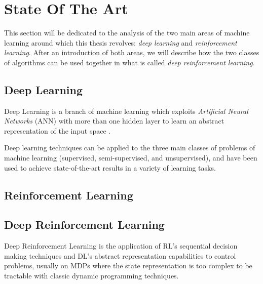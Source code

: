 \chapter{State Of The Art}
\label{ch2_SOA}
\thispagestyle{empty}

\vspace{0.5cm}

\noindent This section will be dedicated to the analysis of the two main areas 
of machine learning around which this thesis revolves: \textit{deep learning} 
and \textit{reinforcement learning}. 
After an introduction of both areas, we 
will describe how the two classes of algorithms can be used together in what is 
called \textit{deep reinforcement learning}.

\section{Deep Learning}
Deep Learning is a branch of machine learning which exploits \textit{Artificial 
Neural Networks} (ANN) with more than one hidden layer to learn an abstract 
representation of the input space \cite{lecun2015deep}. 

Deep learning techniques can be applied to the three main classes of problems 
of machine learning (supervised, semi-supervised, and unsupervised), and have 
been used to achieve state-of-the-art results in a variety of learning tasks.


\section{Reinforcement Learning}

\section{Deep Reinforcement Learning}
Deep Reinforcement Learning is the application of RL's sequential decision 
making techniques and DL's abstract representation capabilities to control 
problems, usually on MDPs where the state representation is too complex to be 
tractable with classic dynamic programming techniques. 



